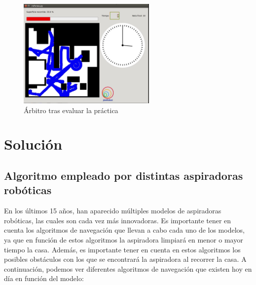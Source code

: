 \begin{figure}[H]
  \begin{center}
    \includegraphics[width=0.6\textwidth]{figures/Vacuum/Referee_Vacuum_3.png}
		\caption{Árbitro tras evaluar la práctica}
		\label{fig.Referee_Vacuum3}
		\end{center}
\end{figure}

\section{Solución}
\subsection{Algoritmo empleado por distintas aspiradoras robóticas}
En los últimos 15 años, han aparecido múltiples modelos de aspiradoras robóticas, las cuales son cada vez más innovadoras. Es importante tener en cuenta los algoritmos de navegación que llevan a cabo cada uno de los modelos, ya que en función de estos algoritmos la aspiradora limpiará en menor o mayor tiempo la casa. Además, es importante tener en cuenta en estos algoritmos los posibles obstáculos con los que se encontrará la aspiradora al recorrer la casa. A continuación, podemos ver diferentes algoritmos de navegación que existen hoy en día en función del modelo:

